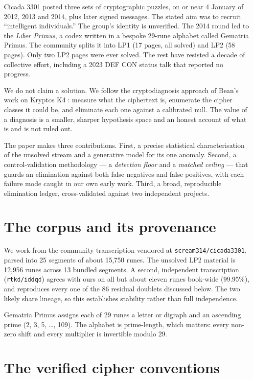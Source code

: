 \documentclass[11pt]{article}
\begin{document}
Cicada 3301 posted three sets of cryptographic puzzles, on or near 4 January of 2012, 2013 and 2014, plus later signed messages. The stated aim was to recruit ``intelligent individuals.'' The group's identity is unverified. The 2014 round led to the \emph{Liber Primus}, a codex written in a bespoke 29-rune alphabet called Gematria Primus. The community splits it into LP1 (17 pages, all solved) and LP2 (58 pages). Only two LP2 pages were ever solved. The rest have resisted a decade of collective effort, including a 2023 DEF CON status talk that reported no progress.

We do not claim a solution. We follow the cryptodiagnosis approach of Bean's work on Kryptos K4 \cite{bean2021}: measure what the ciphertext is, enumerate the cipher classes it could be, and eliminate each one against a calibrated null. The value of a diagnosis is a smaller, sharper hypothesis space and an honest account of what is and is not ruled out.

The paper makes three contributions. First, a precise statistical characterisation of the unsolved stream and a generative model for its one anomaly. Second, a control-validation methodology --- a \emph{detection floor} and a \emph{matched ceiling} --- that guards an elimination against both false negatives and false positives, with each failure mode caught in our own early work. Third, a broad, reproducible elimination ledger, cross-validated against two independent projects.

\section{The corpus and its provenance}

We work from the community transcription vendored at \texttt{scream314/cicada3301}, parsed into 25 segments of about 15,750 runes. The unsolved LP2 material is 12,956 runes across 13 bundled segments. A second, independent transcription (\texttt{rtkd/iddqd}) agrees with ours on all but about eleven runes book-wide (99.95\%), and reproduces every one of the 86 residual doublets discussed below. The two likely share lineage, so this establishes stability rather than full independence.

Gematria Primus assigns each of 29 runes a letter or digraph and an ascending prime (2, 3, 5, …, 109). The alphabet is prime-length, which matters: every non-zero shift and every multiplier is invertible modulo 29.

\section{The verified cipher conventions}
\end{document}
